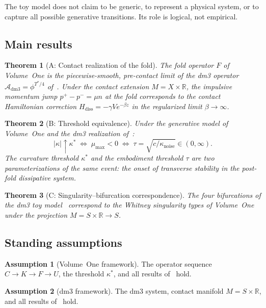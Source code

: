 \documentclass[12pt, oneside]{book}
\theoremstyle{plain}
\newtheorem{theorem}{Theorem}[section]
\theoremstyle{definition}
\newtheorem{assumption}{Assumption}[section]
\theoremstyle{remark}
\newcommand{\R}{\mathbb{R}}
\begin{document}
The toy model does not claim to be generic, to represent a physical
system, or to capture all possible generative transitions. Its role
is logical, not empirical.

\subsection{Main results}

\begin{theorem}[A: Contact realization of the fold]
\label{thm:A}
The fold operator $F$ of Volume~One is the piecewise-smooth,
pre-contact limit of the dm3 operator
$\mathcal{A}_{\mathrm{dm3}} = \phi^{T^*/4}$ of~\cite{Paper1}.
Under the contact extension $M = X\times\R$, the impulsive
momentum jump $p^+ - p^- = \mu n$ at the fold corresponds to
the contact Hamiltonian correction
$H_{\mathrm{diss}} = -\gamma V e^{-\beta z}$
in the regularized limit $\beta\to\infty$.
\end{theorem}

\begin{theorem}[B: Threshold equivalence]
\label{thm:B}
Under the generative model of Volume~One and the dm3
realization of~\cite{Paper1}:
\[
  |\kappa|\uparrow\kappa^*
  \;\iff\;
  \mu_{\max} < 0
  \;\iff\;
  \tau = \sqrt{c/\kappa_{\mathrm{noise}}} \in (0,\infty).
\]
The curvature threshold $\kappa^*$ and the embodiment threshold
$\tau$ are two parameterizations of the same event: the onset of
transverse stability in the post-fold dissipative system.
\end{theorem}

\begin{theorem}[C: Singularity--bifurcation correspondence]
\label{thm:C}
The four bifurcations of the dm3 toy model~\cite{Paper2}
correspond to the Whitney singularity types of Volume~One
under the projection $M = S\times\R\to S$.
\end{theorem}

\subsection{Standing assumptions}

\begin{assumption}[Volume~One framework]
The operator sequence $C\to K\to F\to U$, the threshold $\kappa^*$,
and all results of~\cite{PO1} hold.
\end{assumption}

\begin{assumption}[dm3 framework]
The dm3 system, contact manifold $M=S\times\R$, and all results
of~\cite{Paper1,Paper2} hold.
\end{assumption}
\end{document}
